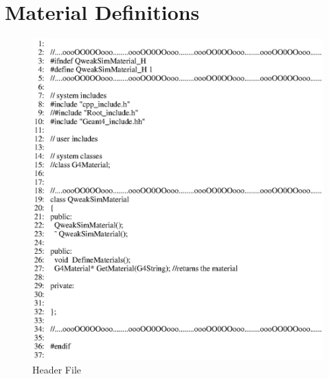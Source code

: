 \chapter{Material Definitions}\label{CHP_XVII}

\clearpage

\begin{figure}[h]
  \hspace{0cm}
  \includegraphics[scale=0.8]{./figures17/QweakSimMaterial.hh.eps}
  \caption{\label{SourceXVII1} Header File}
           \label{fig:XVII-SC-1}
\end{figure}
\clearpage

